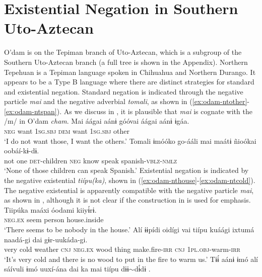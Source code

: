 \documentclass[output=paper,draft,draftmode,colorlinks,citecolor=brown]{langscibook}
\begin{document}
\section{Existential Negation in Southern Uto-Aztecan}
\label{sec:odam-exnegsouth}
O’dam is on the Tepiman branch of Uto-Aztecan, which is a subgroup of the
Southern Uto-Aztecan branch (a full tree is shown in the Appendix).
Northern Tepehuan is a Tepiman language spoken in Chihuahua and Northern
Durango. It appears to be a Type B language where there are distinct
strategies for standard and existential negation. Standard negation is
indicated through the negative particle \emph{mai} and the negative
adverbial \emph{tomali}, as shown in (\ref{ex:odam-ntother}-\ref{ex:odam-ntspan}). As we
discuss in , it is plausible that \emph{mai} is cognate with the /m/ in O'dam \emph{cham}.
\ea
\label{ex:odam-ntother}
\gll Mai 	áágai 	aánɨ 		góóvai	áágai	aánɨ 		ɨgáa.\\
\textsc{neg} 	want	\textsc{1sg.sbj} 	\textsc{dem}	want 	\textsc{1sg.sbj}	other\\
\glt ‘I do not want those, I want the others.’ \citep[26]{bascom2003}
\z 
\ea
\label{ex:odam-ntspan}
\gll Tomali 	ɨmóóko 	go-ááli 	mai 	maátɨ 	ñioókai	oobáí-kɨ-dɨ.\\
not		one		\textsc{det}-children	\textsc{neg}	know	speak		spanish-\textsc{vblz-nmlz}\\
\glt ‘None of those children can speak Spanish.’ \citep[32]{bascom2003}
\z 
Existential negation is indicated by the negative existential \emph{tiípu(ka)}, shown in (\ref{ex:odam-nthouse}-\ref{ex:odam-ntcold}). The negative existential is apparently compatible with the negative particle \emph{mai}, as shown in , although it is not clear if the construction in  is used for emphasis.
\ea
\label{ex:odam-nthouse}
\gll Tiipúka 	maáxi 	óodami 	kiiyɨ́rɨ.\\
\textsc{neg.ex}	seem	person		house.inside\\
\glt ‘There seems to be nobody in the house.’ \citep[264]{bascomm1998}
\z 
\ea
\label{ex:odam-ntcold}
\gll Alí 	ɨɨpídi	oidígi 		vai 	tiípu 		kuáági	ixtumá		naadá-gi dai 	gɨr-uukáda-gi.\\
	very	cold	weather	\textsc{cnj}	\textsc{neg.ex}	wood	thing		make.fire-\textsc{irr} \textsc{cnj}	\textsc{1pl.obj}-warm-\textsc{irr}\\
\glt ‘It’s very cold and there is no wood to put in the fire to warm us.’ \citep[264]{bascomm1998}
\z 
\ea
\label{ex:odam-hive}
\gll Tɨɨ́ 	aánɨ 		ɨmó	alí 	sáívuli 	ɨmó 	uuxí-ána 	dai ka 		mai	tiípu 		dɨɨ$\sim$dɨ́dɨ .\\
\end{document}
